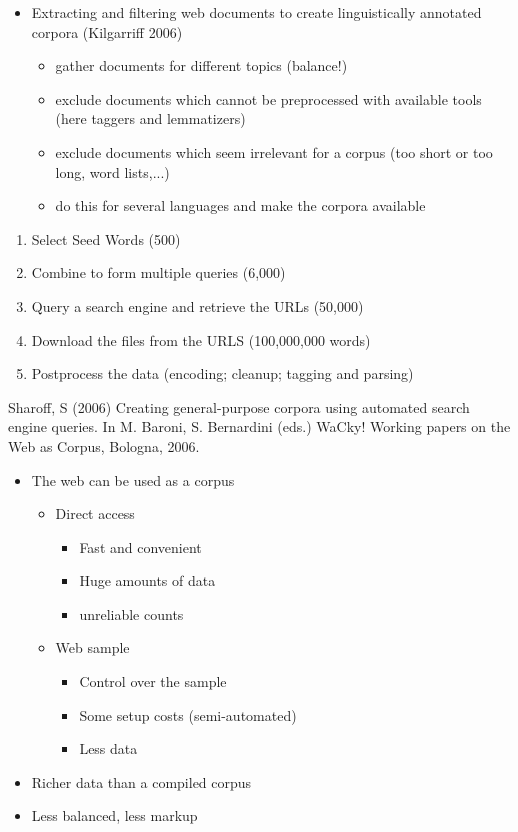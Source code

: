 \documentclass[a4paper,landscape,headrule,footrule,xetex]{foils}
\begin{document}
\MyLogo{}
\begin{itemize}
\item Extracting and filtering web documents to create linguistically
  annotated corpora (Kilgarriff 2006)
  \begin{itemize}
  \item gather documents for different topics (balance!)
  \item exclude documents which cannot be preprocessed with available
    tools (here taggers and lemmatizers)
  \item exclude documents which seem irrelevant for a corpus (too short or
    too long, word lists,...)
  \item do this for several languages and make the corpora available
  \end{itemize}
\end{itemize}



\begin{enumerate}
\item Select Seed Words (500)
\item Combine to form multiple queries (6,000)
\item Query a search engine and retrieve the URLs (50,000)
\item Download the files from the URLS (100,000,000 words)
\item Postprocess the data (encoding; cleanup; tagging and parsing)
\end{enumerate}

Sharoff, S (2006) Creating general-purpose corpora using automated search engine queries. In M. Baroni, S. Bernardini (eds.) WaCky! Working papers on the Web as Corpus, Bologna, 2006.

\MyLogo{}
 
\begin{itemize}
\item The web can be used as a corpus
  \begin{itemize}
  \item Direct access
    \begin{itemize}
    \item Fast and convenient
    \item Huge amounts of data
    \item[\Bad] unreliable counts 
    \end{itemize}
  \item Web sample
    \begin{itemize}
    \item Control over the sample
    \item Some setup costs (semi-automated)
    \item[\Bad] Less data 
    \end{itemize}
  \end{itemize}
\item Richer data than a compiled corpus
\item[\Bad] Less balanced, less markup
\end{itemize}
\end{document}
